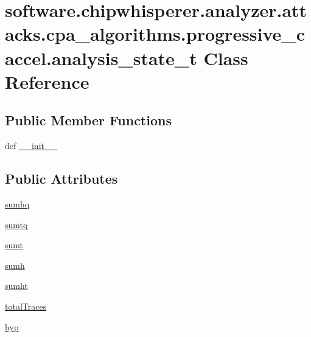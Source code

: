 \hypertarget{classsoftware_1_1chipwhisperer_1_1analyzer_1_1attacks_1_1cpa__algorithms_1_1progressive__caccel_1_1analysis__state__t}{}\section{software.\+chipwhisperer.\+analyzer.\+attacks.\+cpa\+\_\+algorithms.\+progressive\+\_\+caccel.\+analysis\+\_\+state\+\_\+t Class Reference}
\label{classsoftware_1_1chipwhisperer_1_1analyzer_1_1attacks_1_1cpa__algorithms_1_1progressive__caccel_1_1analysis__state__t}
\subsection*{Public Member Functions}
\begin{DoxyCompactItemize}
\item 
def \hyperlink{classsoftware_1_1chipwhisperer_1_1analyzer_1_1attacks_1_1cpa__algorithms_1_1progressive__caccel_1_1analysis__state__t_a1fad176661cd727fa483505b998053c6}{\+\_\+\+\_\+init\+\_\+\+\_\+}
\end{DoxyCompactItemize}
\subsection*{Public Attributes}
\begin{DoxyCompactItemize}
\item 
\hyperlink{classsoftware_1_1chipwhisperer_1_1analyzer_1_1attacks_1_1cpa__algorithms_1_1progressive__caccel_1_1analysis__state__t_a937a7de88eff6893cec9f542b9a494c4}{sumhq}
\item 
\hyperlink{classsoftware_1_1chipwhisperer_1_1analyzer_1_1attacks_1_1cpa__algorithms_1_1progressive__caccel_1_1analysis__state__t_a620c11a2802bb42bc97838f954573763}{sumtq}
\item 
\hyperlink{classsoftware_1_1chipwhisperer_1_1analyzer_1_1attacks_1_1cpa__algorithms_1_1progressive__caccel_1_1analysis__state__t_ab6cef24d143077878b14d44f24fde2c6}{sumt}
\item 
\hyperlink{classsoftware_1_1chipwhisperer_1_1analyzer_1_1attacks_1_1cpa__algorithms_1_1progressive__caccel_1_1analysis__state__t_a4a19ba8d8e55067567dd82784168215b}{sumh}
\item 
\hyperlink{classsoftware_1_1chipwhisperer_1_1analyzer_1_1attacks_1_1cpa__algorithms_1_1progressive__caccel_1_1analysis__state__t_aa030a2eab9ed6d4ecc3b13ecd5d6d8a1}{sumht}
\item 
\hyperlink{classsoftware_1_1chipwhisperer_1_1analyzer_1_1attacks_1_1cpa__algorithms_1_1progressive__caccel_1_1analysis__state__t_a99a62e22dca029cbaab063b2d51c8e1f}{total\+Traces}
\item 
\hyperlink{classsoftware_1_1chipwhisperer_1_1analyzer_1_1attacks_1_1cpa__algorithms_1_1progressive__caccel_1_1analysis__state__t_ac8a2b457d3679ef1ea73cbdd2e4487b9}{hyp}
\end{DoxyCompactItemize}


